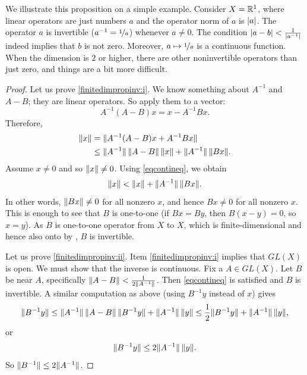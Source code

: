 We illustrate this proposition on a simple example.
Consider $X={\mathbb{R}}^1$, where linear operators are just
numbers $a$ and the operator norm of $a$ is $\lvert {a} \rvert$.
The operator $a$ is invertible ($a^{-1} = \nicefrac{1}{a}$)
whenever $a \not=0$.  The condition $\lvert {a-b} \rvert < \frac{1}{\lvert {a^{-1}} \rvert}$
indeed implies that $b$ is not zero.  Moreover, $a \mapsto \nicefrac{1}{a}$
is a continuous function.
When the dimension is $2$ or higher,
there are other noninvertible operators than just zero,
and things are a bit more difficult.

\begin{proof}
Let us prove \ref{finitedimpropinv:i}.   We know something about $A^{-1}$
and $A-B$; they are linear operators.
So apply them to a vector:
\begin{equation*}
A^{-1}(A-B)x
=
x-A^{-1}Bx .
\end{equation*}
Therefore,
\begin{equation*}
\begin{split}
\lVert {x} \rVert 
& =
\lVert {A^{-1} (A-B)x + A^{-1}Bx} \rVert
\\
& \leq
\lVert {A^{-1}} \rVert\,\lVert {A-B} \rVert\, \lVert {x} \rVert + \lVert {A^{-1}} \rVert\,\lVert {Bx} \rVert .
\end{split}
\end{equation*}
Assume $x \neq 0$ and so $\lVert {x} \rVert \neq 0$.
Using \eqref{eqcontineq}, we obtain
\begin{equation*}
\lVert {x} \rVert < \lVert {x} \rVert + \lVert {A^{-1}} \rVert \, \lVert {Bx} \rVert .
\end{equation*}
In other words, $\lVert {Bx} \rVert \not= 0$ for all nonzero $x$, and hence
$Bx \not= 0$ for all nonzero $x$.  This is enough to see that
$B$ is one-to-one (if $Bx = By$, then $B(x-y) = 0$, so $x=y$).
As $B$ is one-to-one operator from $X$ to $X$, which is finite-dimensional
and hence also onto by ,
$B$ is invertible.

Let us prove \ref{finitedimpropinv:ii}.
Item \ref{finitedimpropinv:i} implies that $GL(X)$ is open.
We must show that the inverse is continuous.
Fix a $A \in GL(X)$.  Let $B$ be near $A$,
specifically $\lVert {A-B} \rVert < \frac{1}{2 \lVert {A^{-1}} \rVert}$.
Then \eqref{eqcontineq} is satisfied and $B$ is invertible.
A similar computation as above (using $B^{-1}y$ instead of $x$) gives
\begin{equation*}
\lVert {B^{-1}y} \rVert \leq 
\lVert {A^{-1}} \rVert \, \lVert {A-B} \rVert \,  \lVert {B^{-1}y} \rVert + \lVert {A^{-1}} \rVert \, \lVert {y} \rVert
\leq
\frac{1}{2} \lVert {B^{-1}y} \rVert + \lVert {A^{-1}} \rVert\,\lVert {y} \rVert ,
\end{equation*}
or
\begin{equation*}
\lVert {B^{-1}y} \rVert \leq 
2\lVert {A^{-1}} \rVert\,\lVert {y} \rVert .
\end{equation*}
So
$
\lVert {B^{-1}} \rVert \leq 2 \lVert {A^{-1}} \rVert
$.


\end{proof}
